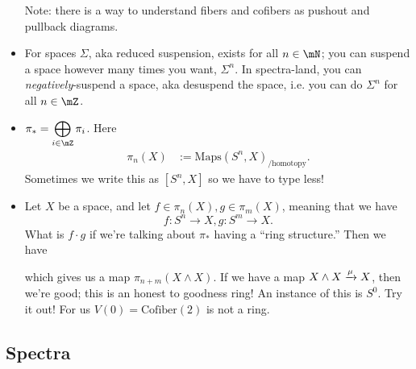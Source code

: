 \begin{itemize}
    Note: there is a way to understand fibers and cofibers as pushout and pullback diagrams. 
    \item For spaces $\Sigma$, aka reduced suspension, exists for all $n\in \mN$; you can suspend a space however many times you want, $\Sigma^n$. In spectra-land, you can \emph{negatively}-suspend a space, aka desuspend the space, i.e. you can do $\Sigma^n$ for all $n\in \mZ$. 
    \item $\ds\pi_\ast = \bigoplus_{i\in \mZ} \pi_i$. Here \begin{align*}
        \pi_n(X)&:=\text{Maps}(S^n,X)_{/\text{homotopy}}.
    \end{align*} Sometimes we write this as $[S^n,X]$ so we have to type less!
    \item Let $X$ be a space, and let $f\in \pi_n(X), g\in \pi_m(X)$, meaning that we have $$f:S^n\to X, g:S^m\to X.$$ What is $f\cdot g$ if we're talking about $\pi_\ast$ having a ``ring structure.'' Then we have 
    \begin{center}
    \end{center}
    which gives us a map $\pi_{n+m}(X\wedge X)$. If we have a map $X\wedge X \xrightarrow{\mu} X$, then we're good; this is an honest to goodness ring! An instance of this is $S^0$. Try it out! For us $V(0) = \text{Cofiber}(2)$ is not a ring. 
\end{itemize}


\lineyspace

\subsection{Spectra}

